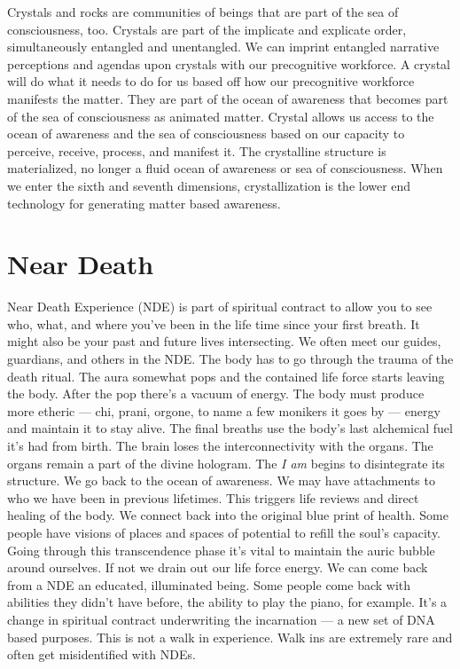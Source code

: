 \documentclass[letterpaper,9pt,twoside,titlepage,onecolumn,openany]{book}
\begin{document}
Crystals and rocks are communities of beings that are part of the sea of
consciousness, too. Crystals are part of the implicate and explicate
order, simultaneously entangled and unentangled. We can imprint
entangled narrative perceptions and agendas upon crystals with our
precognitive workforce. A crystal will do what it needs to do for us
based off how our precognitive workforce manifests the matter. They are
part of the ocean of awareness that becomes part of the sea of
consciousness as animated matter. Crystal allows us access to the ocean
of awareness and the sea of consciousness based on our capacity to
perceive, receive, process, and manifest it. The crystalline structure
is materialized, no longer a fluid ocean of awareness or sea of
consciousness. When we enter the sixth and seventh dimensions,
crystallization is the lower end technology for generating matter based
awareness.

\section*{Near Death}\label{near-death}

Near Death Experience (NDE) is part of spiritual contract to allow you
to see who, what, and where you've been in the life time since your
first breath. It might also be your past and future lives intersecting.
We often meet our guides, guardians, and others in the NDE. The body has
to go through the trauma of the death ritual. The aura somewhat pops and
the contained life force starts leaving the body. After the pop there's
a vacuum of energy. The body must produce more etheric --- chi, prani,
orgone, to name a few monikers it goes by --- energy and maintain it to
stay alive. The final breaths use the body's last alchemical fuel it's
had from birth. The brain loses the interconnectivity with the organs.
The organs remain a part of the divine hologram. The \emph{I am} begins
to disintegrate its structure. We go back to the ocean of awareness. We
may have attachments to who we have been in previous lifetimes. This
triggers life reviews and direct healing of the body. We connect back
into the original blue print of health. Some people have visions of
places and spaces of potential to refill the soul's capacity. Going
through this transcendence phase it's vital to maintain the auric bubble
around ourselves. If not we drain out our life force energy. We can come
back from a NDE an educated, illuminated being. Some people come back
with abilities they didn't have before, the ability to play the piano,
for example. It's a change in spiritual contract underwriting the
incarnation --- a new set of DNA based purposes. This is not a walk in
experience. Walk ins are extremely rare and often get misidentified with
NDEs.
\end{document}
